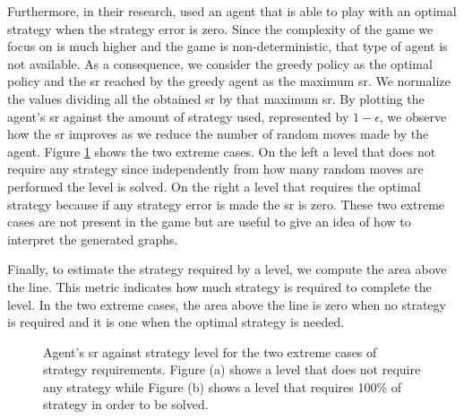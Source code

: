 Furthermore, in their research, \citeauthor{isaksen_simulating_2017} used an agent that is able to play with an optimal strategy when the strategy error is zero. Since the complexity of the game we focus on is much higher and the game is non-deterministic, that type of agent is not available. As a consequence, we consider the greedy policy as the optimal policy and the \acs{sr} reached by the greedy agent as the maximum \acs{sr}. We normalize the values dividing all the obtained \acs{sr} by that maximum \acs{sr}. By plotting the agent's \acs{sr} against the amount of strategy used, represented by $1 - \epsilon$, we observe how the \acs{sr} improves as we reduce the number of random moves made by the agent. Figure \ref{fig:extremes} shows the two extreme cases. On the left a level that does not require any strategy since independently from how many random moves are performed the level is solved. On the right a level that requires the optimal strategy because if any strategy error is made the \acs{sr} is zero. These two extreme cases are not present in the game but are useful to give an idea of how to interpret the generated graphs.

Finally, to estimate the strategy required by a level, we compute the area above the line. This metric indicates how much strategy is required to complete the level. In the two extreme cases, the area above the line is zero when no strategy is required and it is one when the optimal strategy is needed.
\begin{figure}[h]
  \centering
    
    \caption{Agent's \acs{sr} against strategy level for the two extreme cases of strategy requirements. Figure (a) shows a level that does not require any strategy while Figure (b) shows a level that requires 100\% of strategy in order to be solved.}
    \label{fig:extremes}
\end{figure}